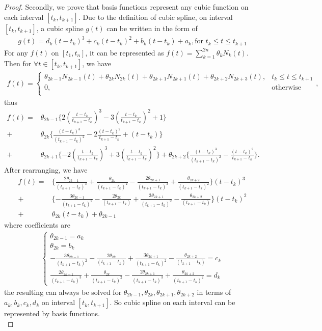 \begin{proof}
Secondly, we prove that basis functions represent any cubic function on each interval $[t_k, t_{k+1}]$. Due to the definition of cubic spline, on interval $[t_k, t_{k+1}]$, a cubic spline $g(t)$ can be written in the form of
\begin{eqnarray}
g(t)=d_k (t-t_k)^3+c_k(t-t_k)^2+b_k(t-t_k)+a_k, \mbox{for $t_k \leq t \leq t_{k+1}$}
\end{eqnarray}
For any $f(t)$ on $[t_1, t_n]$, it can be represented as $f(t)=\sum_{k=1}^{2n} \theta_k N_k(t)$. Then for $\forall t \in [t_k,t_{k+1}]$, we have
\begin{align*}
f(t)=\begin{cases}
\theta_{2k-1}N_{2k-1}(t)+\theta_{2k}N_{2k}(t)+\theta_{2k+1}N_{2k+1}(t)+\theta_{2k+2}N_{2k+3}(t), & t_k \leq t \leq t_{k+1}  \\
0, & \mbox{otherwise}\\
\end{cases},
\end{align*}
thus
\begin{align*}
f(t)=&\theta_{2k-1}\{ 2(\frac{t-t_{k}}{t_{k+1}-t_{k}})^3-3(\frac{t-t_{k}}{t_{k+1}-t_{k}})^2+1  \} \\+&\theta_{2k} \{  \frac{(t-t_{k})^3}{(t_{k+1}-t_{k})^2}-2\frac{(t-t_{k})^2}{t_{k+1}-t_{k}}+(t-t_{k}) \} \\
+&\theta_{2k+1} \{ -2(\frac{t-t_k}{t_{k+1}-t_k})^3+3(\frac{t-t_k}{t_{k+1}-t_k})^2  \}  +\theta_{2k+2} \{  \frac{(t-t_k)^3}{(t_{k+1}-t_k)^2}-\frac{(t-t_k)^2}{t_{k+1}-t_k} \}.
\end{align*}
After rearranging, we have
\begin{align*}
f(t)=& \{ \frac{2\theta_{2k-1}}{(t_{k+1}-t_{k})^3} +\frac{\theta_{2k}}{(t_{k+1}-t_{k})^2} -\frac{2\theta_{2k+1}}{(t_{k+1}-t_{k})^3} +\frac{\theta_{2k+2}}{(t_{k+1}-t_{k})^2} \} (t-t_k)^3 \\
+&  \{ -\frac{3\theta_{2k-1}}{(t_{k+1}-t_{k})^2} -\frac{2\theta_{2k}}{(t_{k+1}-t_{k})} +\frac{3\theta_{2k+1}}{(t_{k+1}-t_{k})^2} - \frac{\theta_{2k+2}}{(t_{k+1}-t_{k})} \} (t-t_k)^2 \\
+&  \theta_{2k} (t-t_k) +\theta_{2k-1}
\end{align*}
where coefficients are
\begin{align*}
\begin{cases}
\theta_{2k-1}=a_k\\
\theta_{2k}=b_k\\
-\frac{3\theta_{2k-1}}{(t_{k+1}-t_{k})^2} -\frac{2\theta_{2k}}{(t_{k+1}-t_{k})} +\frac{3\theta_{2k+1}}{(t_{k+1}-t_{k})^2} - \frac{\theta_{2k+2}}{(t_{k+1}-t_{k})}=c_k\\
\frac{2\theta_{2k-1}}{(t_{k+1}-t_{k})^3} +\frac{\theta_{2k}}{(t_{k+1}-t_{k})^2} -\frac{2\theta_{2k+1}}{(t_{k+1}-t_{k})^3} +\frac{\theta_{2k+2}}{(t_{k+1}-t_{k})^2}=d_k
\end{cases}
\end{align*}
the resulting can always be solved for $\theta_{2k-1}, \theta_{2k},\theta_{2k+1},\theta_{2k+2}$ in terms of $a_k,b_k,c_k,d_k$ on interval $[t_k, t_{k+1}]$. So cubic spline on each interval can be represented by basis functions. \\


\end{proof}
